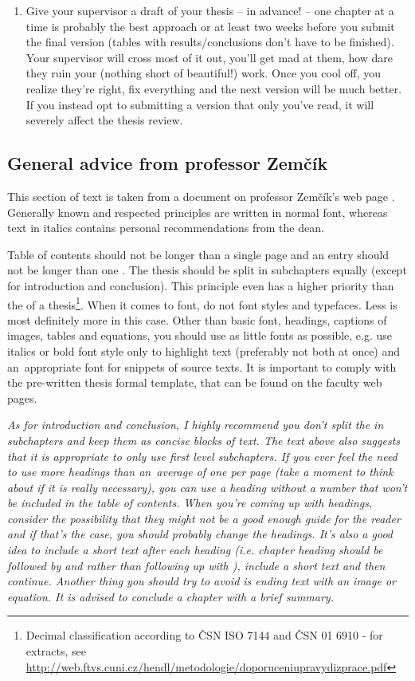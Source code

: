 \begin{enumerate}
  \item{Give your supervisor a draft of your thesis -- in advance! -- one chapter at a time is probably the best approach or at least two weeks before you submit the final version (tables with results/conclusions don't have to be finished). Your supervisor will cross most of it out, you'll get mad at them, how dare they ruin your (nothing short of beautiful!) work. Once you cool off, you realize they're right, fix everything and the next version will be much better. If you instead opt to submitting a version that only you've read, it will severely affect the thesis review.}
\end{enumerate}

\subsection*{General advice from professor Zemčík}
This section of text is taken from a document on professor Zemčík's web page \cite{Zemcik}. Generally known and respected principles are written in normal font, whereas text in italics contains  personal recommendations from the dean.

Table of contents should not be longer than a single page and an entry should not be longer than one . The thesis should be split in subchapters equally (except for introduction and conclusion). This principle even has a higher priority than the  of a thesis\footnote{Decimal classification according to ČSN ISO 7144 and ČSN 01 6910 - for extracts, see \url{http://web.ftvs.cuni.cz/hendl/metodologie/doporuceniupravydizprace.pdf}}. When it comes to font, do not  font styles and typefaces. Less is most definitely more in this case. Other than basic font, headings, captions of images, tables and equations, you should use as little fonts as possible, e.g. use italics or bold font style only to highlight text (preferably not both at once) and an~appropriate  font for snippets of source texts. It is important to comply with the pre-written thesis formal template, that can be found on the faculty web pages.

\it As for introduction and conclusion, I highly recommend you don't split the in subchapters and keep them as concise blocks of text. The text above also suggests that it is appropriate to only use first level subchapters. If you ever feel the need to use more headings than an~average of one per page (take a moment to think about if it is really necessary), you can use a  heading without a number that won't be included in the table of contents. When you're coming up with headings, consider the possibility that they might not be a good enough guide for the reader and if that's the case, you should probably change the headings. It's also a good idea to include a short text after each heading (i.e. chapter heading should be followed by  and rather than following up with ), include a short text and then continue. Another thing you should try to avoid is ending text with an image or equation. It is advised to conclude a chapter with a brief summary.

